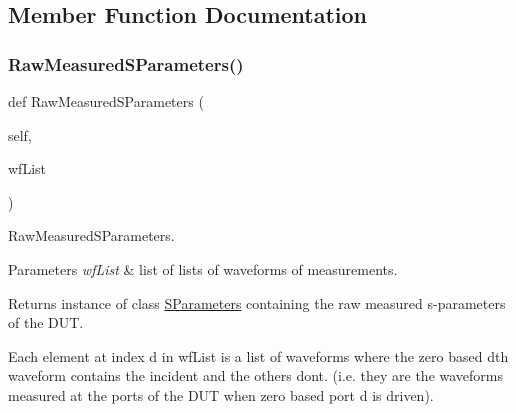 \subsection{Member Function Documentation}
\mbox{\label{classSignalIntegrity_1_1Measurement_1_1TDR_1_1TDRWaveformToSParameterConverter_1_1TDRWaveformToSParameterConverter_a6ff074fa355062d77a954060b9107410}} 
\subsubsection{\texorpdfstring{Raw\+Measured\+S\+Parameters()}{RawMeasuredSParameters()}}
{\footnotesize\ttfamily def Raw\+Measured\+S\+Parameters (\begin{DoxyParamCaption}\item[{}]{self,  }\item[{}]{wf\+List }\end{DoxyParamCaption})}



Raw\+Measured\+S\+Parameters. 


\begin{DoxyParams}{Parameters}
{\em wf\+List} & list of lists of waveforms of measurements. \\
\hline
\end{DoxyParams}
\begin{DoxyReturn}{Returns}
instance of class \hyperlink{namespaceSignalIntegrity_1_1SParameters}{S\+Parameters} containing the raw measured s-\/parameters of the D\+UT.
\end{DoxyReturn}
Each element at index d in wf\+List is a list of waveforms where the zero based dth waveform contains the incident and the others don\textquotesingle{}t. (i.\+e. they are the waveforms measured at the ports of the D\+UT when zero based port d is driven).

